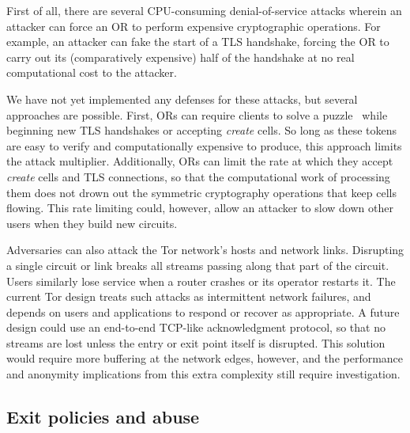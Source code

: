 \documentclass[twocolumn]{article}
\begin{document}
First of all, there are several CPU-consuming denial-of-service
attacks wherein an attacker can force an OR to perform expensive
cryptographic operations.  For example, an attacker can 
fake the start of a TLS handshake, forcing the OR to carry out its
(comparatively expensive) half of the handshake at no real computational
cost to the attacker.

We have not yet implemented any defenses for these attacks, but several
approaches are possible. First, ORs can
require clients to solve a puzzle~\cite{puzzles-tls} while beginning new
TLS handshakes or accepting \emph{create} cells.  So long as these
tokens are easy to verify and computationally expensive to produce, this
approach limits the attack multiplier.  Additionally, ORs can limit
the rate at which they accept \emph{create} cells and TLS connections,
so that
the computational work of processing them does not drown out the
symmetric cryptography operations that keep cells
flowing.  This rate limiting could, however, allow an attacker
to slow down other users when they build new circuits.


Adversaries can also attack the Tor network's hosts and network
links. Disrupting a single circuit or link breaks all streams passing
along that part of the circuit. Users similarly lose service
when a router crashes or its operator restarts it. The current
Tor design treats such attacks as intermittent network failures, and
depends on users and applications to respond or recover as appropriate. A
future design could use an end-to-end TCP-like acknowledgment protocol,
so that no streams are lost unless the entry or exit point itself is
disrupted. This solution would require more buffering at the network
edges, however, and the performance and anonymity implications from this
extra complexity still require investigation.

\subsection{Exit policies and abuse}
\label{subsec:exitpolicies}

\end{document}
